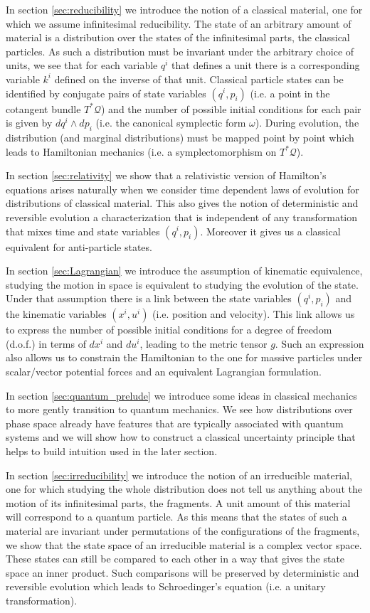 \documentclass[smallextended]{svjour3}
\numberwithin{equation}{section}
\begin{document}
In section \ref{sec:reducibility} we introduce the notion of a classical material, one for which we assume infinitesimal reducibility. The state of an arbitrary amount of material is a distribution over the states of the infinitesimal parts, the classical particles. As such a distribution must be invariant under the arbitrary choice of units, we see that for each variable $q^i$ that defines a unit there is a corresponding variable $k^i$ defined on the inverse of that unit. Classical particle states can be identified by conjugate pairs of state variables $(q^i, p_i)$ (i.e. a point in the cotangent bundle $T^*\mathcal{Q}$) and the number of possible initial conditions for each pair is given by $dq^i \wedge dp_i$ (i.e. the canonical symplectic form $\omega$). During evolution, the distribution (and marginal distributions) must be mapped point by point which leads to Hamiltonian mechanics (i.e. a symplectomorphism on $T^*\mathcal{Q}$).

In section \ref{sec:relativity} we show that a relativistic version of Hamilton's equations arises naturally when we consider time dependent laws of evolution for distributions of classical material. This also gives the notion of deterministic and reversible evolution a characterization that is independent of any transformation that mixes time and state variables $(q^i, p_i)$. Moreover it gives us a classical equivalent for anti-particle states.

In section \ref{sec:Lagrangian} we introduce the assumption of kinematic equivalence, studying the motion in space is equivalent to studying the evolution of the state. Under that assumption there is a link between the state variables $(q^i, p_i)$ and the kinematic variables $(x^i, u^i)$ (i.e. position and velocity). This link allows us to express the number of possible initial conditions for a degree of freedom (d.o.f.) in terms of $dx^i$ and $du^i$, leading to the metric tensor $g$. Such an expression also allows us to constrain the Hamiltonian to the one for massive particles under scalar/vector potential forces and an equivalent Lagrangian formulation.

In section \ref{sec:quantum_prelude} we introduce some ideas in classical mechanics to more gently transition to quantum mechanics. We see how distributions over phase space already have features that are typically associated with quantum systems and we will show how to construct a classical uncertainty principle that helps to build intuition used in the later section.

In section \ref{sec:irreducibility} we introduce the notion of an irreducible material, one for which studying the whole distribution does not tell us anything about the motion of its infinitesimal parts, the fragments. A unit amount of this material will correspond to a quantum particle. As this means that the states of such a material are invariant under permutations of the configurations of the fragments, we show that the state space of an irreducible material is a complex vector space. These states can still be compared to each other in a way that gives the state space an inner product. Such comparisons will be preserved by deterministic and reversible evolution which leads to Schroedinger's equation (i.e. a unitary transformation).
\end{document}
